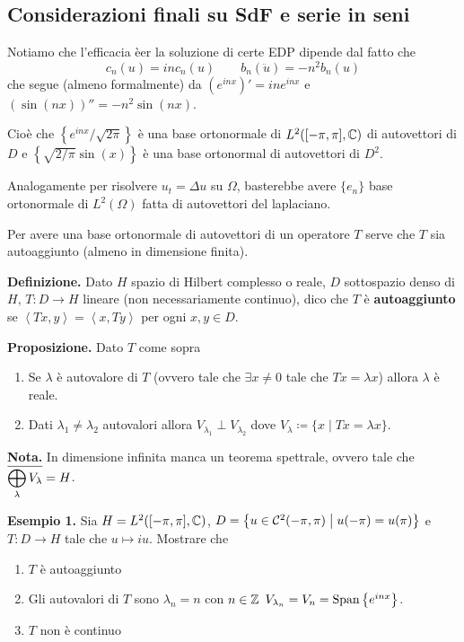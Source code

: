 \subsection{Considerazioni finali su SdF e serie in seni}

Notiamo che l'efficacia èer la soluzione di certe EDP dipende dal fatto che
%
$$
	c_n(u) = in c_n(u) \qquad b_n(\ddot u) = -n^2 b_n(u)
$$
%
che segue (almeno formalmente) da $(e^{inx})' = in e^{inx}$ e $(\sin(nx))'' = -n^2 \sin(nx)$.

Cioè che $\left\{ e^{inx} / \sqrt{2\pi} \right\}$ è una base ortonormale di $L^2([-\pi,\pi],\mathbb C)$ di autovettori di $D$ e $\left\{ \sqrt{2/\pi} \sin(x)  \right\}$ è una base ortonormal di autovettori di $D^2$.

Analogamente per risolvere $u_t = \Delta u$ su $\Omega$, basterebbe avere $\{ e_n \}$ base ortonormale di $L^2(\Omega)$ fatta di autovettori del laplaciano.

Per avere una base ortonormale di autovettori di un operatore $T$ serve che $T$ sia autoaggiunto (almeno in dimensione finita).

\textbf{Definizione.} Dato $H$ spazio di Hilbert complesso o reale, $D$ sottospazio denso di $H$, $T \colon D \to H$ lineare (non necessariamente continuo), dico che $T$ è \textbf{autoaggiunto} se $\left<Tx,y \right> = \left<x,Ty \right>$ per ogni $x,y \in D$.

\textbf{Proposizione.} Dato $T$ come sopra
\begin{enumerate}

	\item Se $\lambda$ è autovalore di $T$ (ovvero tale che $\exists x \neq 0$ tale che $Tx = \lambda x$) allora $\lambda$ è reale.


	\item Dati $\lambda_1 \neq \lambda_2$ autovalori allora $V_{\lambda_1} \perp V_{\lambda_2}$ dove $V_\lambda \coloneqq \{ x \mid Tx = \lambda x \}$.

\end{enumerate}

\textbf{Nota.} In dimensione infinita manca un teorema spettrale, ovvero tale che $\displaystyle \overline{\bigoplus_\lambda V_\lambda} = H$.


\textbf{Esempio 1.} Sia $H = L^2([-\pi,\pi],\mathbb C)$, $D = \left\{ u \in \mathcal{C}^2 (-\pi,\pi) \;\middle|\; u(-\pi) = u(\pi) \right\}$ e $T \colon D \to H$ tale che $u \mapsto iu$.
Mostrare che
\begin{enumerate}

	\item $T$ è autoaggiunto

	\item Gli autovalori di $T$ sono $\lambda_n = n$ con $n \in \mathbb Z$ $V_{\lambda_n} = V_n = \operatorname{Span} \left\{ e^{inx} \right\}$.

	\item $T$ non è continuo

\end{enumerate}


